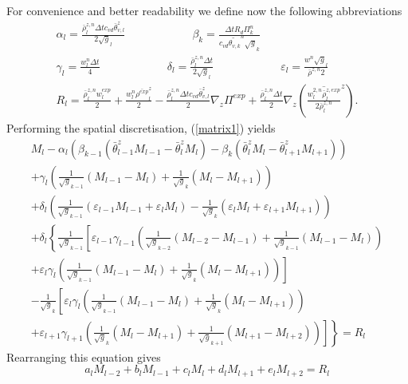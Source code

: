 \documentclass[a4paper,10pt]{article}
\begin{document}
For convenience and better readability we define now the following abbreviations
\begin{gather}
 \alpha_l=\frac{\bar{\rho}^{z,n}_l\Delta t c_{vd}\bar\theta^z_{v,l}}{2\sqrt{g}_l}\qquad\qquad\qquad
 \beta_k =\frac{\Delta t R_d\Pi^n_k}{c_{vd}\widetilde{\theta_{v,k}}^n\sqrt{g}_k}\nonumber\\
 \gamma_l=\frac{w^n_l\Delta t}{4}\qquad\qquad\qquad
 \delta_l=\frac{\bar{\rho}^{z,n}_l\Delta t}{2\sqrt{g}_l}\qquad\qquad\qquad
 \varepsilon_l=\frac{w^n\sqrt{g}_l}{\bar\rho^{z,n}2}\nonumber\\
R_l=\frac{\bar{\rho}^{z,n}_lw^{exp}_l}{2}+\frac{w^n_l\overline{\rho^{exp}}^z_l}{2}
-\frac{\bar{\rho}^{z,n}_l\Delta t c_{vd}\bar\theta^z_{v,l}}{2}\nabla_z \Pi^{exp}
+\frac{\bar{\rho}^{z,n}_l\Delta t}{2} \nabla_z \left(
\overline{\frac{w^{2,n}_l\bar\rho^{z,exp}_l}{2\bar\rho^{z,n}_l}}^z\right).\nonumber
\end{gather}
Performing the spatial discretisation, (\ref{matrix1}) yields
\begin{gather}
 M_l
-\alpha_l\left(\beta_{k-1}(\bar{\theta}^z_{l-1}M_{l-1}-\bar{\theta}^z_lM_l)
               -\beta_k(\bar{\theta}^z_lM_l-\bar{\theta}^z_{l+1}M_{l+1})\right)\nonumber\\
+\gamma_l\left(\frac{1}{\sqrt{g}_{k-1}}(M_{l-1}-M_l)+\frac{1}{\sqrt{g}_{k}}(M_l-M_{l+1})\right)\nonumber\\
+\delta_l\left(\frac{1}{\sqrt{g}_{k-1}}\left(\varepsilon_{l-1}M_{l-1}+\varepsilon_lM_l\right)
              -\frac{1}{\sqrt{g}_k}\left(\varepsilon_lM_l+\varepsilon_{l+1}M_{l+1}\right)\right)\nonumber\\
+\delta_l\left\{
                \frac{1}{\sqrt{g}_{k-1}}\left[\varepsilon_{l-1}\gamma_{l-1}
                \left(\frac{1}{\sqrt{g}_{k-2}}(M_{l-2}-M_{l-1})+\frac{1}{\sqrt{g}_{k-1}}(M_{l-1}-M_{l})\right)\right.\right.\nonumber\\
\left.+\varepsilon_l\gamma_l                        \left(\frac{1}{\sqrt{g}_{k-1}}(M_{l-1}-M_l)+\frac{1}{\sqrt{g}_k}(M_l-M_{l+1})\right)\right]\nonumber\\
-\frac{1}{\sqrt{g}_k}\left[\varepsilon_l\gamma_l\left(\frac{1}{\sqrt{g}_{k-1}}(M_{l-1}-M_l)+\frac{1}{\sqrt{g}_k}(M_l-M_{l+1})\right)\right.\nonumber\\
\left.\left.+\varepsilon_{l+1}\gamma_{l+1}\left(\frac{1}{\sqrt{g}_k}(M_l-M_{l+1})+\frac{1}{\sqrt{g}_{k+1}}(M_{l+1}-M_{l+2})\right)\right]\right\}=R_l\nonumber
\end{gather}
Rearranging this equation gives 
$$a_lM_{l-2}+b_lM_{l-1}+c_lM_l+d_lM_{l+1}+e_lM_{l+2}=R_l$$
\end{document}
